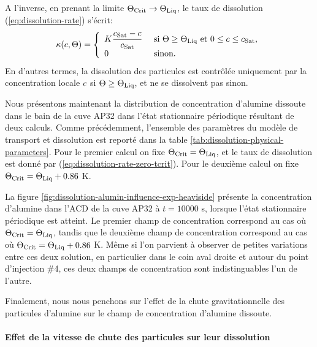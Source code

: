 A l'inverse, en prenant la limite $\Theta_\text{Crit} \to  \Theta_\text{Liq}$, le taux de
dissolution (\ref{eq:dissolution-rate}) s'écrit:
\begin{equation}
  \kappa(c,\Theta) = \left\{
  \begin{array}{ll}
  K \displaystyle\frac{c_\text{Sat} - c}{c_\text{Sat}}& \text{ si } \Theta
  \geq \Theta_\text{Liq}\text{ et } 0\leq c \leq c_\text{Sat},\\
  0 &  \text{ sinon.}
  \end{array}
  \right.
\end{equation}
En d'autres termes, la dissolution des particules est contrôlée
uniquement par la concentration locale $c$ si
$\Theta \geq \Theta_\text{Liq}$, et ne se dissolvent pas sinon.

Nous présentons maintenant la distribution de concentration d'alumine
dissoute dans le bain de la cuve AP32 dans l'état stationnaire
périodique résultant de deux calculs. Comme précédemment, l'ensemble
des paramètres du modèle de transport et dissolution est reporté dans
la table \ref{tab:dissolution-physical-parameters}. Pour le premier
calcul on fixe $\Theta_\text{Crit} = \Theta_\text{Liq}$, et le taux de dissolution est donné par
(\ref{eq:dissolution-rate-zero-tcrit}). Pour le deuxième calcul on
fixe $\Theta_\text{Crit} = \Theta_\text{Liq} + 0.86$ \si{\kelvin}.

La figure \ref{fig:dissolution-alumin-influence-exp-heaviside}
présente la concentration d'alumine dans l'ACD de la cuve AP32 à $t =
\num{10000}$ \si{\second}, lorsque l'état stationnaire périodique est
atteint. Le premier champ de concentration correspond au cas où
$\Theta_\text{Crit} = \Theta_\text{Liq}$, tandis que le deuxième champ de concentration
correspond au cas où $\Theta_\text{Crit} = \Theta_\text{Liq} + 0.86$ \si{\kelvin}. Même si
l'on parvient à observer de petites variations entre ces deux
solution, en particulier dans le coin aval droite et autour du point
d'injection \#4, ces deux champs de concentration sont indistinguables
l'un de l'autre.

Finalement, nous nous penchons sur l'effet de la chute
gravitationnelle des particules d'alumine sur le champ de
concentration d'alumine dissoute.

\paragraph{Effet de la vitesse de chute des particules sur leur
  dissolution}


